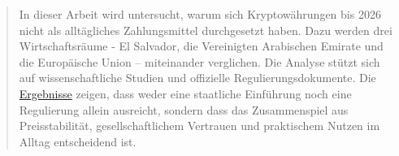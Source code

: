\begin{abstract}
In dieser Arbeit wird untersucht, warum sich Kryptowährungen bis 2026 nicht als alltägliches Zahlungsmittel durchgesetzt haben. Dazu werden drei Wirtschaftsräume - El Salvador, die Vereinigten Arabischen Emirate und die Europäische Union – miteinander verglichen. Die Analyse stützt sich auf wissenschaftliche Studien und offizielle Regulierungsdokumente. Die \hyperref[chap:interpretation]{Ergebnisse} zeigen, dass weder eine staatliche Einführung noch eine Regulierung allein ausreicht, sondern dass das Zusammenspiel aus Preisstabilität, gesellschaftlichem Vertrauen und praktischem Nutzen im Alltag entscheidend ist.
\end{abstract}
